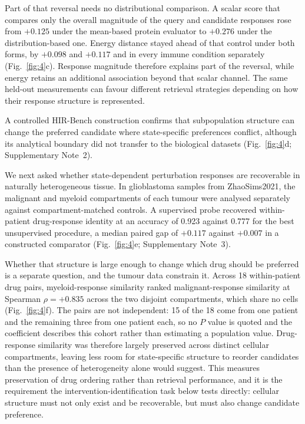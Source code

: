 \documentclass[11pt,letterpaper]{article}
\newcommand{\PREMISEDISJOINT}{+0.835}
\newcommand{\SHAPEMAGMEAN}{+0.125}
\newcommand{\SHAPEMAGDIST}{+0.276}
\newcommand{\SHAPEEDGEDIST}{+0.117}
\newcommand{\SHAPEEDGEMEAN}{+0.098}
\begin{document}
Part of that reversal needs no distributional comparison. A scalar score that compares only the overall magnitude of the query and candidate responses rose from $\SHAPEMAGMEAN$ under the mean-based protein evaluator to $\SHAPEMAGDIST$ under the distribution-based one. Energy distance stayed ahead of that control under both forms, by $\SHAPEEDGEMEAN$ and $\SHAPEEDGEDIST$ and in every immune condition separately (Fig.~\ref{fig:4}c). Response magnitude therefore explains part of the reversal, while energy retains an additional association beyond that scalar channel. The same held-out measurements can favour different retrieval strategies depending on how their response structure is represented.

A controlled HIR-Bench construction confirms that subpopulation structure can change the preferred candidate where state-specific preferences conflict, although its analytical boundary did not transfer to the biological datasets (Fig.~\ref{fig:4}d; Supplementary Note~2).

We next asked whether state-dependent perturbation responses are recoverable in naturally heterogeneous tissue\cite{dataZhao}. In glioblastoma samples from ZhaoSims2021, the malignant and myeloid compartments of each tumour were analysed separately against compartment-matched controls. A supervised probe recovered within-patient drug-response identity at an accuracy of 0.923 against 0.777 for the best unsupervised procedure, a median paired gap of $+0.117$ against $+0.007$ in a constructed comparator (Fig.~\ref{fig:4}e; Supplementary Note~3).

Whether that structure is large enough to change which drug should be preferred is a separate question, and the tumour data constrain it. Across 18 within-patient drug pairs, myeloid-response similarity ranked malignant-response similarity at Spearman $\rho=\PREMISEDISJOINT$ across the two disjoint compartments, which share no cells (Fig.~\ref{fig:4}f). The pairs are not independent: 15 of the 18 come from one patient and the remaining three from one patient each, so no $P$ value is quoted and the coefficient describes this cohort rather than estimating a population value. Drug-response similarity was therefore largely preserved across distinct cellular compartments, leaving less room for state-specific structure to reorder candidates than the presence of heterogeneity alone would suggest. This measures preservation of drug ordering rather than retrieval performance, and it is the requirement the intervention-identification task below tests directly: cellular structure must not only exist and be recoverable, but must also change candidate preference.
\end{document}
